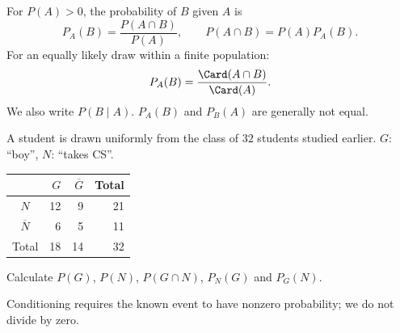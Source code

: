 \begin{keypoint}[Definition]
For $P(A)>0$, the probability of $B$ given $A$ is
\[P_A(B)=\frac{P(A\cap B)}{P(A)},\qquad P(A\cap B)=P(A)P_A(B).\]
For an equally likely draw within a finite population:
\[P_A(B)=\frac{\Card(A\cap B)}{\Card(A)}.\]
We also write $P(B\mid A)$. $P_A(B)$ and $P_B(A)$ are generally not equal.
\end{keypoint}
\begin{example}A student is drawn uniformly from the class of $32$ students studied earlier. $G$: ``boy'', $N$: ``takes CS''.\end{example}
\begin{center}\begin{tabular}{c|rr|r}
&$G$&$\overline G$&Total\\\hline
$N$&12&9&21\\$\overline N$&6&5&11\\\hline Total&18&14&32
\end{tabular}\end{center}
Calculate $P(G)$, $P(N)$, $P(G\cap N)$, $P_N(G)$ and $P_G(N)$.
\begin{pitfall}Conditioning requires the known event to have nonzero probability; we do not divide by zero.\end{pitfall}

